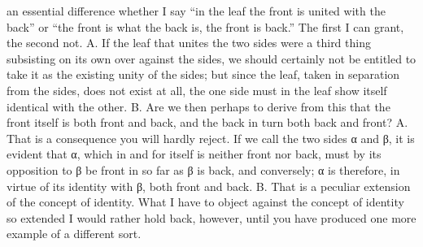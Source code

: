 \documentclass[12pt,a4paper]{book}
\begin{document}
an essential difference whether I say ``in the leaf the front is united with
the back'' or ``the front is what the back is, the front is back.'' The first I
can grant, the second not. A. If the leaf that unites the two sides were a
third thing subsisting on its own over against the sides, we should certainly
not be entitled to take it as the existing unity of the sides; but since the
leaf, taken in separation from the sides, does not exist at all, the one side
must in the leaf show itself identical with the other. B. Are we then perhaps
to derive from this that the front itself is both front and back, and the back
in turn both back and front? A. That is a consequence you will hardly reject.
If we call the two sides α and β, it is
evident that α, which in and for itself is neither front nor back, must by its
opposition to β be front in so far as β is back, and conversely; α is
therefore, in virtue of its identity with β, both front and back. B. That is a
peculiar extension of the concept of identity. What I have to object against
the concept of identity so extended I would rather hold back, however, until
you have produced one more example of a different sort.
\end{document}
